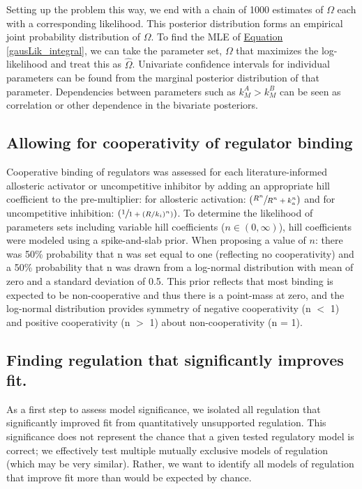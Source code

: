 Setting up the problem this way, we end with a chain of 1000 estimates of $\Omega$ each with a corresponding likelihood.  This posterior distribution forms an empirical joint probability distribution of $\Omega$.  To find the MLE of \hyperref[gausLik_integral]{Equation \ref{gausLik_integral}}, we can take the parameter set, $\Omega$ that maximizes the log-likelihood and treat this as $\hat{\Omega}$. Univariate confidence intervals for individual parameters can be found from the marginal posterior distribution of that parameter.  Dependencies between parameters such as $k^{A}_{M} > k^{B}_{M}$ can be seen as correlation or other dependence in the bivariate posteriors.

\subsection*{Allowing for cooperativity of regulator binding}

Cooperative binding of regulators was assessed for each literature-informed allosteric activator or uncompetitive inhibitor by adding an appropriate hill coefficient to the pre-multiplier: for allosteric activation: $\left(\sfrac{R^{n}}{R^{n} + k_{a}^{n}}\right)$ and for uncompetitive inhibition: $(\sfrac{1}{1 + (R/k_{i})^n)})$.  To determine the likelihood of parameters sets including variable hill coefficients ($n \in (0,\infty)$), hill coefficients were modeled using a spike-and-slab prior.  When proposing a value of $n$: there was 50\% probability that n was set equal to one (reflecting no cooperativity) and a 50\% probability that n was drawn from a log-normal distribution with mean of zero and a standard deviation of 0.5.  This prior reflects that most binding is expected to be non-cooperative and thus there is a point-mass at zero, and the log-normal distribution provides symmetry of negative cooperativity (n $<$ 1) and positive cooperativity (n $>$ 1) about non-cooperativity (n = 1).

\subsection*{Finding regulation that significantly improves fit.}

As a first step to assess model significance, we isolated all regulation that significantly improved fit from quantitatively unsupported regulation. This significance does not represent the chance that a given tested regulatory model is correct; we effectively test multiple mutually exclusive models of regulation (which may be very similar). Rather, we want to identify all models of regulation that improve fit more than would be expected by chance.

